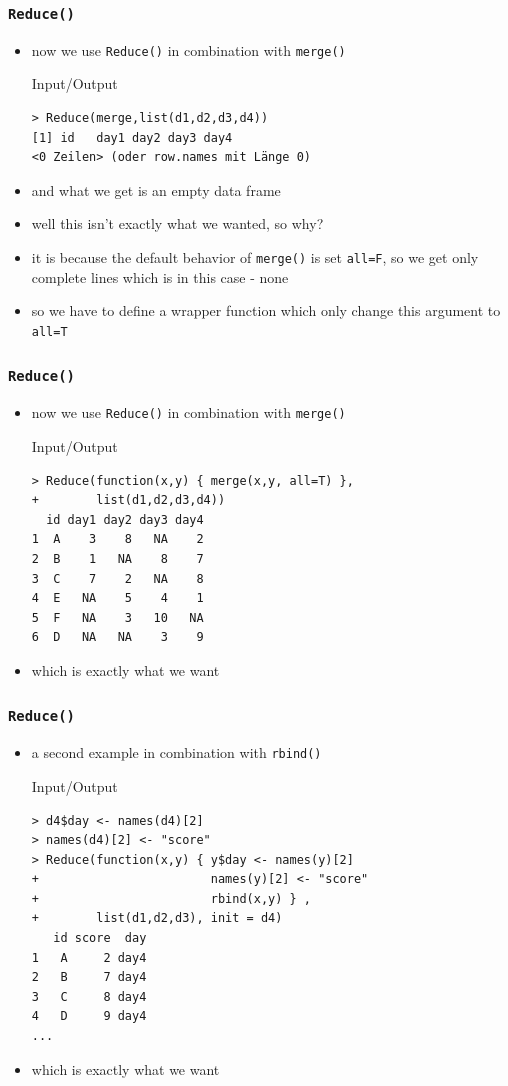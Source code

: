 \documentclass[xcolor={table},c]{beamer}
\begin{document}
\begin{frame}[fragile]\frametitle{\texttt{Reduce()}}
  \begin{itemize}
  \item now we use \texttt{Reduce()} in combination with \texttt{merge()}
  \begin{exampleblock}{Input/Output}\tiny
\begin{verbatim}
> Reduce(merge,list(d1,d2,d3,d4))
[1] id   day1 day2 day3 day4
<0 Zeilen> (oder row.names mit Länge 0)
\end{verbatim}
  \end{exampleblock}
\item and what we get is an empty data frame
\item well this isn't exactly what we wanted, so why?
\item it is because the default behavior of \texttt{merge()} is set \texttt{all=F}, so we get only complete lines which is in this case - none
\item so we have to define a wrapper function which only change this argument to \texttt{all=T}
  \end{itemize}

\end{frame}


\begin{frame}[fragile]\frametitle{\texttt{Reduce()}}
  \begin{itemize}
  \item now we use \texttt{Reduce()} in combination with \texttt{merge()}
  \begin{exampleblock}{Input/Output}\small
\begin{verbatim}
> Reduce(function(x,y) { merge(x,y, all=T) },
+        list(d1,d2,d3,d4))
  id day1 day2 day3 day4
1  A    3    8   NA    2
2  B    1   NA    8    7
3  C    7    2   NA    8
4  E   NA    5    4    1
5  F   NA    3   10   NA
6  D   NA   NA    3    9
\end{verbatim}
  \end{exampleblock}
\item which is exactly what we want
  \end{itemize}
\end{frame}

\begin{frame}[fragile]\frametitle{\texttt{Reduce()}}
  \begin{itemize}
  \item a second example in combination with \texttt{rbind()}
  \begin{exampleblock}{Input/Output}\small
\begin{verbatim}
> d4$day <- names(d4)[2]
> names(d4)[2] <- "score"
> Reduce(function(x,y) { y$day <- names(y)[2]
+                        names(y)[2] <- "score"
+                        rbind(x,y) } ,
+        list(d1,d2,d3), init = d4)
   id score  day
1   A     2 day4
2   B     7 day4
3   C     8 day4
4   D     9 day4
...
\end{verbatim}
  \end{exampleblock}
\item which is exactly what we want
  \end{itemize}
\end{frame}
\end{document}

